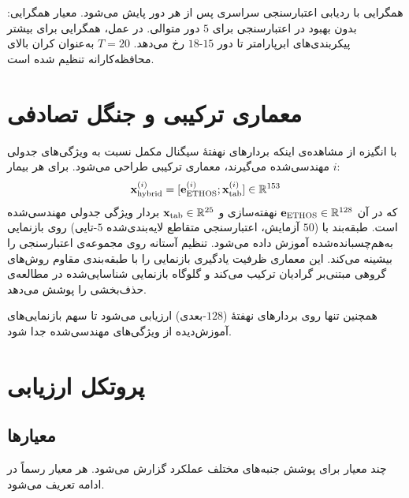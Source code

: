 همگرایی با ردیابی  اعتبارسنجی سراسری پس از هر دور پایش می‌شود. معیار همگرایی: بدون بهبود در  اعتبارسنجی برای $5$ دور متوالی. در عمل، همگرایی برای بیشتر پیکربندی‌های ابرپارامتر تا دور $15$-$18$ رخ می‌دهد. $T=20$ به‌عنوان کران بالای محافظه‌کارانه تنظیم شده است.

\section{معماری ترکیبی  و جنگل تصادفی}
\label{sec:hybrid}

با انگیزه از مشاهده‌ی اینکه بردارهای نهفتۀ  سیگنال مکمل نسبت به ویژگی‌های جدولی مهندسی‌شده می‌گیرند، معماری ترکیبی طراحی می‌شود. برای هر بیمار $i$:
\begin{equation}
\mathbf{x}_{\text{hybrid}}^{(i)} = [\mathbf{e}_{\text{ETHOS}}^{(i)}; \mathbf{x}_{\text{tab}}^{(i)}] \in \mathbb{R}^{153}
\end{equation}
که در آن $\mathbf{e}_{\text{ETHOS}} \in \mathbb{R}^{128}$ نهفته‌سازی   و $\mathbf{x}_{\text{tab}} \in \mathbb{R}^{25}$ بردار ویژگی جدولی مهندسی‌شده است. طبقه‌بند  با  ($50$ آزمایش، اعتبارسنجی متقاطع لایه‌بندی‌شده $5$-تایی) روی بازنمایی به‌هم‌چسبانده‌شده آموزش داده می‌شود. تنظیم آستانه روی مجموعه‌ی اعتبارسنجی  را بیشینه می‌کند. این معماری ظرفیت یادگیری بازنمایی  را با طبقه‌بندی مقاوم روش‌های گروهی مبتنی‌بر گرادیان ترکیب می‌کند و گلوگاه بازنمایی شناسایی‌شده در مطالعه‌ی حذف‌بخشی را پوشش می‌دهد.

همچنین  تنها روی بردارهای نهفتۀ  ($128$-بعدی) ارزیابی می‌شود تا سهم بازنمایی‌های آموزش‌دیده از ویژگی‌های مهندسی‌شده جدا شود.

\section{پروتکل ارزیابی}

\subsection{معیارها}

چند معیار برای پوشش جنبه‌های مختلف عملکرد گزارش می‌شود. هر معیار رسماً در ادامه تعریف می‌شود.

